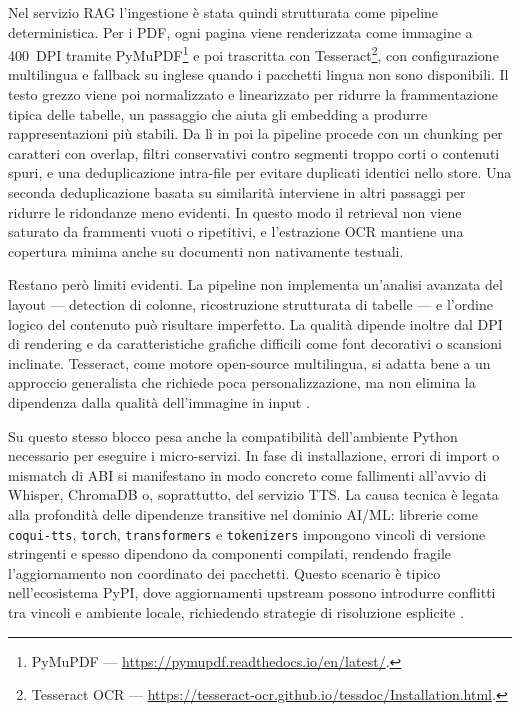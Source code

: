 Nel servizio RAG l'ingestione è stata quindi strutturata come pipeline deterministica. Per i PDF, ogni pagina viene renderizzata come immagine a 400~DPI tramite PyMuPDF\footnote{PyMuPDF --- \url{https://pymupdf.readthedocs.io/en/latest/}.} e poi trascritta con Tesseract\footnote{Tesseract OCR --- \url{https://tesseract-ocr.github.io/tessdoc/Installation.html}.}, con configurazione multilingua e fallback su inglese quando i pacchetti lingua non sono disponibili. Il testo grezzo viene poi normalizzato e linearizzato per ridurre la frammentazione tipica delle tabelle, un passaggio che aiuta gli embedding a produrre rappresentazioni più stabili. Da lì in poi la pipeline procede con un chunking per caratteri con overlap, filtri conservativi contro segmenti troppo corti o contenuti spuri, e una deduplicazione intra-file per evitare duplicati identici nello store. Una seconda deduplicazione basata su similarità interviene in altri passaggi per ridurre le ridondanze meno evidenti. In questo modo il retrieval non viene saturato da frammenti vuoti o ripetitivi, e l'estrazione OCR mantiene una copertura minima anche su documenti non nativamente testuali.

Restano però limiti evidenti. La pipeline non implementa un'analisi avanzata del layout --- detection di colonne, ricostruzione strutturata di tabelle --- e l'ordine logico del contenuto può risultare imperfetto. La qualità dipende inoltre dal DPI di rendering e da caratteristiche grafiche difficili come font decorativi o scansioni inclinate. Tesseract, come motore open-source multilingua, si adatta bene a un approccio generalista che richiede poca personalizzazione, ma non elimina la dipendenza dalla qualità dell'immagine in input \cite{Smith2009Tesseract}.

Su questo stesso blocco pesa anche la compatibilità dell'ambiente Python necessario per eseguire i micro-servizi. In fase di installazione, errori di import o mismatch di ABI si manifestano in modo concreto come fallimenti all'avvio di Whisper, ChromaDB o, soprattutto, del servizio TTS. La causa tecnica è legata alla profondità delle dipendenze transitive nel dominio AI/ML: librerie come \texttt{coqui-tts}, \texttt{torch}, \texttt{transformers} e \texttt{tokenizers} impongono vincoli di versione stringenti e spesso dipendono da componenti compilati, rendendo fragile l'aggiornamento non coordinato dei pacchetti. Questo scenario è tipico nell'ecosistema PyPI, dove aggiornamenti upstream possono introdurre conflitti tra vincoli e ambiente locale, richiedendo strategie di risoluzione esplicite \cite{Wang2020Watchman}.

